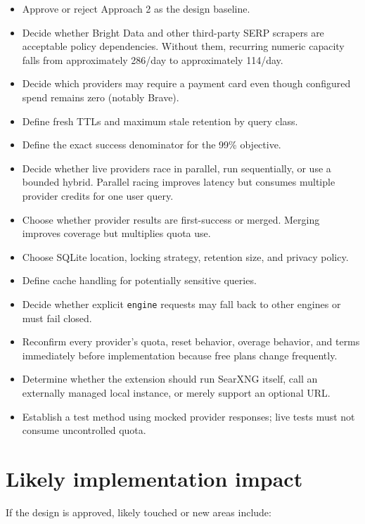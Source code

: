 \documentclass[11pt]{article}
\begin{document}
\begin{itemize}
\item Approve or reject Approach 2 as the design baseline.
\item Decide whether Bright Data and other third-party SERP scrapers are acceptable
policy dependencies.  Without them, recurring numeric capacity falls from
approximately 286/day to approximately 114/day.
\item Decide which providers may require a payment card even though configured
spend remains zero (notably Brave).
\item Define fresh TTLs and maximum stale retention by query class.
\item Define the exact success denominator for the 99\% objective.
\item Decide whether live providers race in parallel, run sequentially, or use a
bounded hybrid.  Parallel racing improves latency but consumes multiple
provider credits for one user query.
\item Choose whether provider results are first-success or merged.  Merging improves
coverage but multiplies quota use.
\item Choose SQLite location, locking strategy, retention size, and privacy policy.
\item Define cache handling for potentially sensitive queries.
\item Decide whether explicit \texttt{engine} requests may fall back to other engines or
must fail closed.
\item Reconfirm every provider's quota, reset behavior, overage behavior, and terms
immediately before implementation because free plans change frequently.
\item Determine whether the extension should run SearXNG itself, call an externally
managed local instance, or merely support an optional URL.
\item Establish a test method using mocked provider responses; live tests must not
consume uncontrolled quota.
\end{itemize}
\section*{Likely implementation impact}
\label{sec:org6ea1e47}

If the design is approved, likely touched or new areas include:
\end{document}
